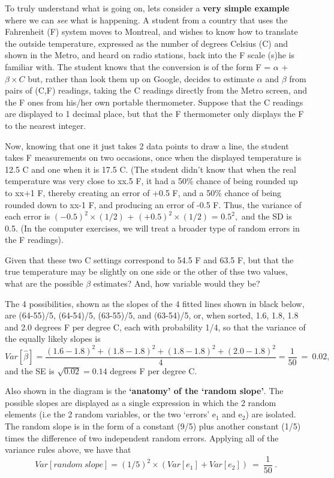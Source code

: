 \documentclass[]{book}
\begin{document}
To truly understand what is going on, lets consider a \textbf{very simple example} where we can \emph{see} what is happening. A student from a country that uses the Fahrenheit (F) system moves to Montreal, and wishes to know how to translate the outside temperature, expressed as the number of degrees Celsius (C) and shown in the Metro, and heard on radio stations, back into the F scale (s)he is familiar with. The student knows that the conversion is of the form F = \(\alpha\) + \(\beta \times C\) but, rather than look them up on Google, decides to estimate \(\alpha\) and \(\beta\) from pairs of (C,F) readings, taking the C readings directly from the Metro screen, and the F ones from his/her own portable thermometer. Suppose that the C readings are displayed to 1 decimal place, but that the F thermometer only displays the F to the nearest integer.

Now, knowing that one it just takes 2 data points to draw a line, the student takes F measurements on two occasions, once when the displayed temperature is 12.5 C and one when it is 17.5 C. (The student didn't know that when the real temperature was very close to xx.5 F, it had a 50\% chance of being rounded up to xx+1 F, thereby creating an error of +0.5 F, and a 50\% chance of being rounded down to xx-1 F, and producing an error of -0.5 F. Thus, the variance of each error is \((-0.5)^2 \times (1/2)\) + \((+0.5)^2 \times (1/2)\) = \(0.5^2,\) and the SD is 0.5. (In the computer exercises, we will treat a broader type of random errors in the F readings).

Given that these two C settings correspond to 54.5 F and 63.5 F, but that the true temperature may be slightly on one side or the other of thse two values, what are the possible \(\beta\) estimates? And, how variable would they be?

The 4 possibilities, shown as the slopes of the 4 fitted lines shown in black below, are (64-55)/5, (64-54)/5, (63-55)/5, and (63-54)/5, or, when sorted, 1.6, 1.8, 1.8 and 2.0 degrees F per degree C, each with probability 1/4, so that the variance of the equally likely slopes is
\[Var[ \hat{\beta} ] =  \frac{(1.6 - 1.8)^2 + (1.8 - 1.8)^2  + (1.8 - 1.8)^2 + (2.0 - 1.8)^2}{4} = \frac{1}{50} \ =  \ 0.02,\]
and the SE is \(\sqrt{0.02} = 0.14\) degrees F per degree C.

Also shown in the diagram is the \textbf{`anatomy' of the `random slope'}. The possible slopes are displayed as a single expression in which the 2 random elements (i.e the 2 random variables, or the two `errors' e\(_1\) and e\(_2\)) are isolated. The random slope is in the form of a constant (9/5) plus another constant (1/5) times the difference of two independent random errors. Applying all of the variance rules above, we have that
\[Var[random  \ slope] = (1/5)^2 \times ( Var[e_1] + Var[e_2])  \ = \ \frac{1}{50} \ .\]
\end{document}
